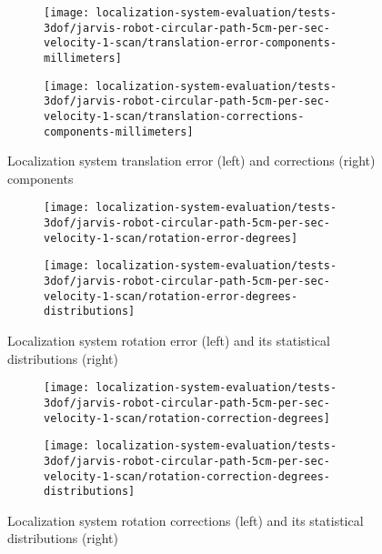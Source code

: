 \begin{figure}[ht]
	\centering
	\begin{subfigure}[h]{.497\textwidth}
		\centering
		\texttt{[image: localization-system-evaluation/tests-3dof/jarvis-robot-circular-path-5cm-per-sec-velocity-1-scan/translation-error-components-millimeters]}
	\end{subfigure}
	\begin{subfigure}[h]{.497\textwidth}
		\centering
		\texttt{[image: localization-system-evaluation/tests-3dof/jarvis-robot-circular-path-5cm-per-sec-velocity-1-scan/translation-corrections-components-millimeters]}
	\end{subfigure}
	\caption{Localization system translation error (left) and corrections (right) components}
	\label{fig:localization-system-evaluation_jarvis-robot-circular-path-5cm-per-sec-velocity-1-scan_translation-errors-components}
\end{figure}

\begin{figure}[ht]
	\centering
	\begin{subfigure}[h]{.497\textwidth}
		\centering
		\texttt{[image: localization-system-evaluation/tests-3dof/jarvis-robot-circular-path-5cm-per-sec-velocity-1-scan/rotation-error-degrees]}
	\end{subfigure}
	\begin{subfigure}[h]{.497\textwidth}
		\centering
		\texttt{[image: localization-system-evaluation/tests-3dof/jarvis-robot-circular-path-5cm-per-sec-velocity-1-scan/rotation-error-degrees-distributions]}
	\end{subfigure}
	\caption{Localization system rotation error (left) and its statistical distributions (right)}
	\label{fig:localization-system-evaluation_jarvis-robot-circular-path-5cm-per-sec-velocity-1-scan_rotation-errors}
\end{figure}

\begin{figure}[ht]
	\centering
	\begin{subfigure}[h]{.497\textwidth}
		\centering
		\texttt{[image: localization-system-evaluation/tests-3dof/jarvis-robot-circular-path-5cm-per-sec-velocity-1-scan/rotation-correction-degrees]}
	\end{subfigure}
	\begin{subfigure}[h]{.497\textwidth}
		\centering
		\texttt{[image: localization-system-evaluation/tests-3dof/jarvis-robot-circular-path-5cm-per-sec-velocity-1-scan/rotation-correction-degrees-distributions]}
	\end{subfigure}
	\caption{Localization system rotation corrections (left) and its statistical distributions (right)}
	\label{fig:localization-system-evaluation_jarvis-robot-circular-path-5cm-per-sec-velocity-1-scan_rotation-errors-corrections}
\end{figure}

